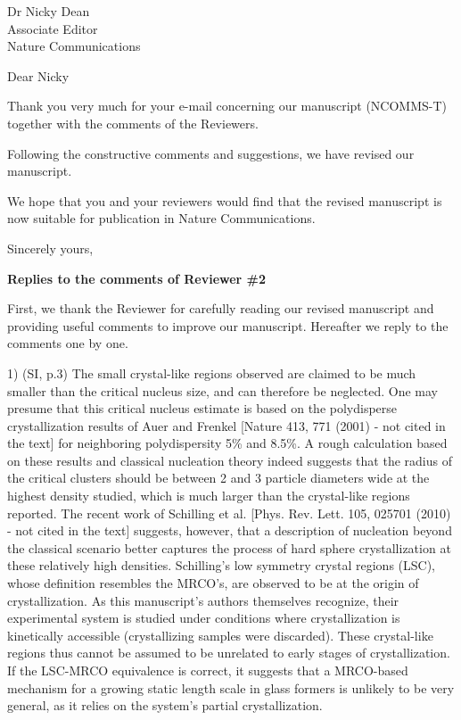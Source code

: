 \documentclass[a4paper, rebuttal, parskip=true, firsthead=false, fromemail=true, foldmarks=false]{scrlttr2}
\begin{document}
 
\begin{letter}{Dr Nicky Dean\\
Associate Editor\\
Nature Communications}
\opening{Dear Nicky}

Thank you very much for your e-mail concerning our manuscript (NCOMMS\nobreakdash-T) together with the comments of the Reviewers. 

Following the constructive comments and suggestions, we have revised our manuscript. 

We hope that you and your reviewers would find that the revised manuscript is now suitable for publication in Nature Communications. 

\closing{Sincerely yours,} 
\clearpage

\textsf{\textbf{Replies to the comments of Reviewer \#2}}

First, we thank the Reviewer for carefully reading our revised manuscript and providing useful comments to improve our manuscript. Hereafter we reply to the comments one by one. 

\begin{quotationi}
1) (SI, p.3) The small crystal-like regions observed are claimed to be much smaller than the critical nucleus size, and can therefore be neglected. One may presume that this critical nucleus estimate is based on the polydisperse crystallization results of Auer and Frenkel [Nature 413, 771 (2001) - not cited in the text] for neighboring polydispersity 5\% and 8.5\%. A rough calculation based on these results and classical nucleation theory indeed suggests that the radius of the critical clusters should be between 2 and 3 particle diameters wide at the highest density studied, which is much larger than the crystal-like regions reported. The recent work of Schilling et al. [Phys. Rev. Lett. 105, 025701 (2010) - not cited in the text] suggests, however, that a description of nucleation beyond the classical scenario better captures the process of hard sphere crystallization at these relatively high densities. Schilling's low symmetry crystal regions (LSC), whose definition resembles the MRCO's, are observed to be at the origin of crystallization. As this manuscript's authors themselves recognize, their experimental system is studied under conditions where crystallization is kinetically accessible (crystallizing samples were discarded). These crystal-like regions thus cannot be assumed to be unrelated to early stages of crystallization. If the LSC-MRCO equivalence is correct, it suggests that a MRCO-based mechanism for a growing static length scale in glass formers is unlikely to be very general, as it relies on the system's partial crystallization.
\end{quotationi}


\end{letter}
\end{document}

